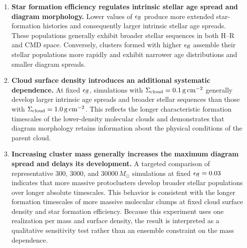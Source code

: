 \documentclass[linenumbers, twocolumn]{aastex631}
\begin{document}
\begin{enumerate}

    \item \textbf{Star formation efficiency regulates intrinsic stellar age spread and diagram morphology.} Lower values of $\epsilon_{\rm ff}$ produce more extended star-formation histories and consequently larger intrinsic stellar age spreads. These populations generally exhibit broader stellar sequences in both H--R and CMD space. Conversely, clusters formed with higher $\epsilon_{\rm ff}$ assemble their stellar populations more rapidly and exhibit narrower age distributions and smaller diagram spreads.

    \item \textbf{Cloud surface density introduces
    an additional systematic dependence.} At fixed $\epsilon_{\rm ff}$, simulations with $\Sigma_{\rm cloud}=0.1\,{\rm g\,cm^{-2}}$ generally develop larger intrinsic age spreads and broader stellar sequences than those with $\Sigma_{\rm cloud}=1.0\,{\rm g\,cm^{-2}}$. This reflects the longer characteristic formation timescales of the lower-density molecular clouds and demonstrates that diagram morphology retains information about the physical conditions of the parent cloud.


    \item \textbf{Increasing cluster mass
    generally increases the maximum diagram
    spread and delays its development.} A targeted comparison of representative $300$, $3000$, and $30000\,M_\odot$ simulations at fixed $\epsilon_{\rm ff}=0.03$ indicates that more massive protoclusters develop broader stellar populations over longer absolute timescales. This behavior is consistent with the longer formation timescales of more massive molecular clumps at fixed cloud surface density and star formation efficiency. Because this experiment uses one realization per mass and surface density, the result is interpreted as a qualitative sensitivity test rather than an ensemble constraint on the mass dependence.


\end{enumerate}
\end{document}

